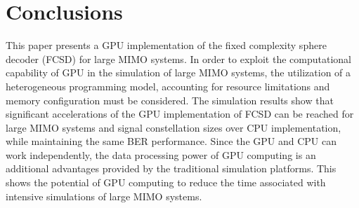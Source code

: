 \documentclass[letterpaper, 10pt, conference,twoside]{ieeeconf}
\begin{document}
\section{Conclusions}\label{conclusion}
This paper presents a GPU implementation of the fixed complexity sphere decoder (FCSD) for large MIMO systems. In order to exploit the computational capability of GPU in the simulation of large MIMO systems, the utilization of a heterogeneous programming model, accounting for resource limitations and memory configuration must be considered. The simulation results show that significant accelerations of the GPU implementation of FCSD can be reached for large MIMO systems and signal constellation sizes over CPU implementation, while maintaining the same BER performance. Since the GPU and CPU can work independently, the data processing power of GPU computing is an additional advantages provided by the traditional simulation platforms. This shows the potential of GPU computing to reduce the time associated with intensive simulations of large MIMO systems.














%
%
%








\end{document}
